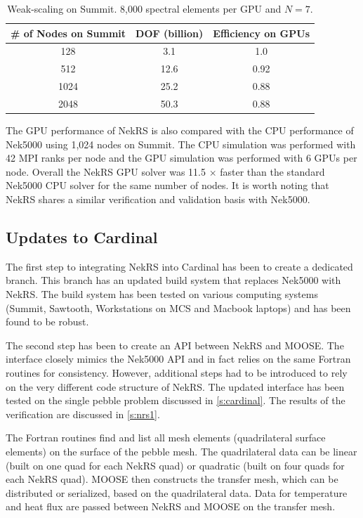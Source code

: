 \begin{table} [!b]
\centering
\caption{Weak-scaling on Summit. 8,000 spectral elements per GPU and $N=7$.}
\label{wscaling}
\begin{tabular}{ccc}
\toprule
\# of Nodes on Summit & DOF (billion) &  Efficiency on GPUs \\
\midrule
 128  & 3.1  & 1.0   \\
 512  & 12.6 & 0.92  \\
 1024 & 25.2 & 0.88  \\
 2048 & 50.3 & 0.88 \\
\bottomrule \end{tabular}
\end{table}

The GPU performance of NekRS is also compared with the CPU performance of Nek5000 using 1,024 nodes on Summit.
The CPU simulation was performed with 42 MPI ranks per node and the GPU simulation was performed with 6 GPUs per node.
Overall the NekRS GPU solver was 11.5 $\times$ faster than the standard Nek5000 CPU solver for the same number of nodes.
It is worth noting that NekRS shares a similar verification and validation basis with Nek5000.

\subsection{Updates to Cardinal}

The first step to integrating NekRS into Cardinal has been to create a dedicated  branch. 
This branch has an updated build system that replaces Nek5000 with NekRS. 
The build system has been tested on various computing systems (Summit, Sawtooth, Workstations on MCS and Macbook laptops) and has been found to be robust.

The second step has been to create an API between NekRS and MOOSE.
The interface closely mimics the Nek5000 API and in fact relies on the same Fortran routines for consistency.
However, additional steps had to be introduced to rely on the very different code structure of NekRS.
The updated interface has been tested on the single pebble problem discussed in \autoref{s:cardinal}.
The results of the verification are discussed in \autoref{s:nrs1}.

The Fortran routines find and list all mesh elements (quadrilateral surface elements) on the surface of the pebble mesh.
The quadrilateral data can be linear (built on one quad for each NekRS quad) or quadratic (built on four quads for each NekRS quad).
MOOSE then constructs the transfer mesh, which can be distributed or serialized, based on the quadrilateral data.
Data for temperature and heat flux are passed between NekRS and MOOSE on the transfer mesh.

